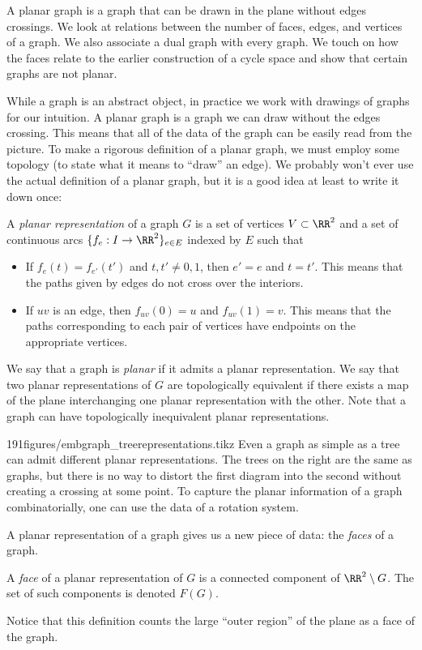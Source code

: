 
\begin{elevator}[Planarity]
A planar graph is a graph that can be drawn in the plane without edges crossings. We look at relations between the number of faces, edges, and vertices of a graph. 
We also associate a dual graph with every graph. 
We touch on how the faces relate to the earlier construction of a cycle space and show that certain graphs are not planar. 
\label{sec:planar:planar}
\end{elevator}

While a graph is an abstract object, in practice we work with drawings of graphs for our intuition. A planar graph is a graph we can draw without the edges crossing. 
This means that all of the data of the graph can be easily read from the picture.
To make a rigorous definition of a planar graph, we must employ some topology (to state what it means to ``draw'' an edge).
We probably won't ever use the actual definition of a planar graph, but it is a good idea at least to write it down once:
\begin{definition}
 A \emph{planar representation} of a graph $G$ is a set of vertices $V\subset \RR^2$ and a set of continuous arcs $\{f_e: I\to \RR^2\}_{e\in E}$ indexed by $E$ such that
 \begin{itemize}
  \item 
    If $f_{e}(t)=f_{e'}(t')$ and $t, t'\neq 0,1$,  then $e'=e$ and $t=t'$. 
    This means that the paths given by edges do not cross over the interiors.  
  \item 
    If $uv$ is an edge, then $f_{uv}(0)=u$ and $f_{uv}(1)=v$. 
    This means that the paths corresponding to each pair of vertices have endpoints on the appropriate vertices.
 \end{itemize}
\end{definition}
We say that a graph is \emph{planar} if it admits a planar representation. We say that two planar representations of $G$ are topologically equivalent if there exists a map of the plane interchanging one planar representation with the other.
Note that a graph can have topologically inequivalent planar representations. 

\begin{examplefigureenv}{191figures/embgraph_treerepresentations.tikz}	Even a graph as simple as a tree can admit different planar representations. The trees on the right are the same as graphs, but there is no way to distort the first diagram into the second without creating a crossing at some point. To capture the planar information of a graph combinatorially, one can use the data of a rotation system.
\end{examplefigureenv}
A planar representation of a graph gives us a new piece of data: the \emph{faces} of a graph. 
\begin{definition} A \emph{face} of a planar representation of $G$ is a connected component of $\RR^2\setminus G$.  The set of such components is denoted $F(G)$. \
\end{definition}
 Notice that this definition counts the large ``outer region'' of the plane as a face of the graph. 
 
